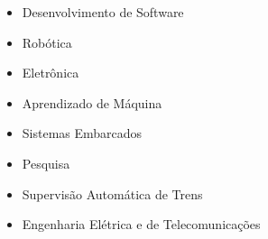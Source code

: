 \documentclass[10pt,a4paper,ragged2e,withhyper]{altacv}
\begin{document}
\begin{paracol}{2}



\nocite{*}


\printbibliography[heading=pubtype,title={\printinfo{\faFile*[regular]}{Artigos Acadêmicos}},type=article]



\switchcolumn


\begin{itemize}
  \item Desenvolvimento de Software
  \item Robótica
  \item Eletrônica
  \item Aprendizado de Máquina
  \item Sistemas Embarcados
  \item Pesquisa
  \item Supervisão Automática de Trens
  \item Engenharia Elétrica e de Telecomunicações
\end{itemize}


\divider

\divider


\medskip



\end{paracol}
\end{document}
